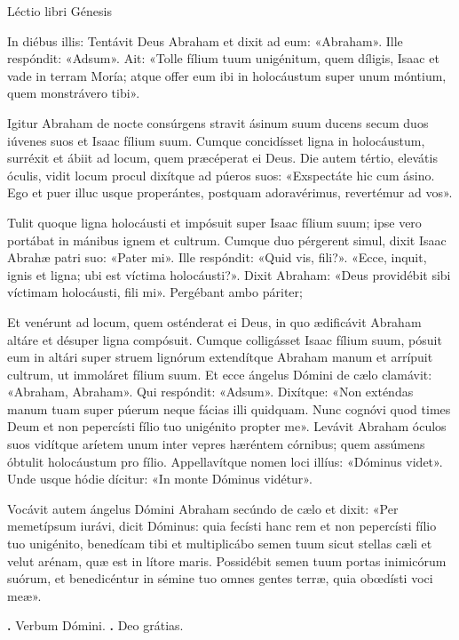 
Léctio libri Génesis

In diébus illis:
Tentávit Deus Abraham et dixit ad eum: «Abraham». Ille respóndit: «Adsum». Ait:
«Tolle fílium tuum unigénitum, quem díligis, Isaac et vade in terram Moría; atque offer eum ibi in holocáustum super unum móntium, quem monstrávero tibi».

Igitur Abraham de nocte consúrgens stravit ásinum suum ducens secum duos iúvenes suos et Isaac fílium suum. Cumque concidísset ligna in holocáustum, surréxit et ábiit ad locum, quem præcéperat ei Deus. 
Die autem tértio, elevátis óculis, vidit locum procul dixítque ad púeros suos: «Exspectáte hic cum ásino. Ego et puer illuc usque properántes, postquam adoravérimus, revertémur ad vos».

Tulit quoque ligna holocáusti et impósuit super Isaac fílium suum; ipse vero portábat in mánibus ignem et cultrum. Cumque duo pérgerent simul, dixit Isaac Abrahæ patri suo: «Pater mi». Ille respóndit: «Quid vis, fili?». «Ecce, inquit, ignis et ligna; ubi est víctima holocáusti?». Dixit Abraham: «Deus providébit sibi víctimam holocáusti, fili mi». Pergébant ambo páriter;

Et venérunt ad locum, quem osténderat ei Deus, in quo ædificávit Abraham altáre
et désuper ligna compósuit. Cumque colligásset Isaac fílium suum, pósuit eum in altári super struem lignórum extendítque Abraham manum et arrípuit cultrum, ut immoláret fílium suum. 
Et ecce ángelus Dómini de cælo clamávit: «Abraham, Abraham». Qui respóndit: «Adsum». Dixítque: «Non exténdas manum tuam super púerum neque fácias illi quidquam. Nunc cognóvi quod times Deum et non pepercísti fílio tuo unigénito propter me».
Levávit Abraham óculos suos vidítque aríetem unum inter vepres hæréntem córnibus; quem assúmens óbtulit holocáustum pro fílio. Appellavítque nomen loci illíus: «Dóminus videt». Unde usque hódie dícitur: «In monte Dóminus vidétur».

Vocávit autem ángelus Dómini Abraham secúndo de cælo et dixit: «Per memetípsum iurávi, dicit Dóminus: quia fecísti hanc rem et non pepercísti fílio tuo unigénito, benedícam tibi et multiplicábo semen tuum sicut stellas cæli et velut arénam, quæ est in lítore maris.
Possidébit semen tuum portas inimicórum suórum, et benedicéntur in sémine tuo omnes gentes terræ, quia obœdísti voci meæ».

\textbf{\Vbar.} Verbum Dómini.
\textbf{\Rbar.} Deo grátias.
\par